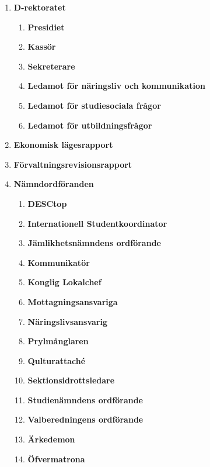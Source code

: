 \documentclass{protokoll}
\begin{document}
  \begin{enumerate}
    \item \textbf{D-rektoratet}
      \begin{enumerate}
         \item \textbf{Presidiet}\\
         \item \textbf{Kassör}\\
         \item \textbf{Sekreterare}\\
         \item \textbf{Ledamot för näringsliv och kommunikation}\\
         \item \textbf{Ledamot för studiesociala frågor}\\
         \item \textbf{Ledamot för utbildningsfrågor}\\
      \end{enumerate}
    \item \textbf{Ekonomisk lägesrapport}\\
    \item \textbf{Förvaltningsrevisionsrapport}\\
    \item \textbf{Nämndordföranden}\\
           \begin{enumerate}
        \item \textbf{DESCtop}\\
        \item \textbf{Internationell Studentkoordinator}\\
        \item \textbf{Jämlikhetsnämndens ordförande}\\
        \item \textbf{Kommunikatör}\\
        \item \textbf{Konglig Lokalchef}\\
        \item \textbf{Mottagningsansvariga}\\
        \item \textbf{Näringslivsansvarig}\\
        \item \textbf{Prylmånglaren}\\
        \item \textbf{Qulturattaché}\\
        \item \textbf{Sektionsidrottsledare}\\
        \item \textbf{Studienämndens ordförande}\\
        \item \textbf{Valberedningens ordförande} \\
        \item \textbf{Ärkedemon}\\
        \item \textbf{Öfvermatrona}\\
      \end{enumerate}
    

\end{enumerate}
\end{document}
